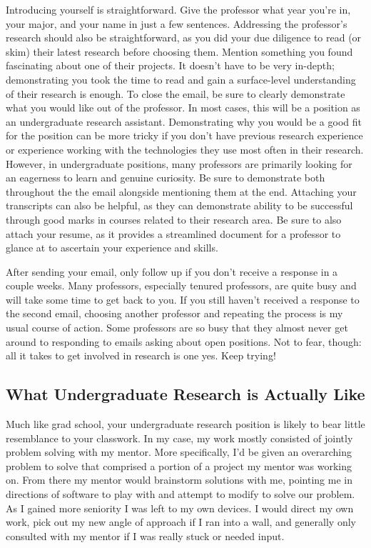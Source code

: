 \documentclass[12pt]{article}
\begin{document}
Introducing yourself is straightforward. Give the professor what year you're in, your major, and your name in just a few sentences. Addressing the professor's research should also be straightforward, as you did your due diligence to read (or skim) their latest research before choosing them. Mention something you found fascinating about one of their projects. It doesn't have to be very in-depth; demonstrating you took the time to read and gain a surface-level understanding of their research is enough. To close the email, be sure to clearly demonstrate what you would like out of the professor. In most cases, this will be a position as an undergraduate research assistant. Demonstrating why you would be a good fit for the position can be more tricky if you don't have previous research experience or experience working with the technologies they use most often in their research. However, in undergraduate positions, many professors are primarily looking for an eagerness to learn and genuine curiosity. \cite{berkeleycoldemail} Be sure to demonstrate both throughout the the email alongside mentioning them at the end. Attaching your transcripts can also be helpful, as they can demonstrate ability to be successful through good marks in courses related to their research area. Be sure to also attach your resume, as it provides a streamlined document for a professor to glance at to ascertain your experience and skills. \cite{berkeleycoldemail}

After sending your email, only follow up if you don't receive a response in a couple weeks. Many professors, especially tenured professors, are quite busy and will take some time to get back to you. If you still haven't received a response to the second email, choosing another professor and repeating the process is my usual course of action. Some professors are so busy that they almost never get around to responding to emails asking about open positions. Not to fear, though: all it takes to get involved in research is one yes. Keep trying!

\subsection{What Undergraduate Research is Actually Like}

Much like grad school, your undergraduate research position is likely to bear little resemblance to your classwork. In my case, my work mostly consisted of jointly problem solving with my mentor. More specifically, I'd be given an overarching problem to solve that comprised a portion of a project my mentor was working on. From there my mentor would brainstorm solutions with me, pointing me in directions of software to play with and attempt to modify to solve our problem. As I gained more seniority I was left to my own devices. I would direct my own work, pick out my new angle of approach if I ran into a wall, and generally only consulted with my mentor if I was really stuck or needed input.
\end{document}
